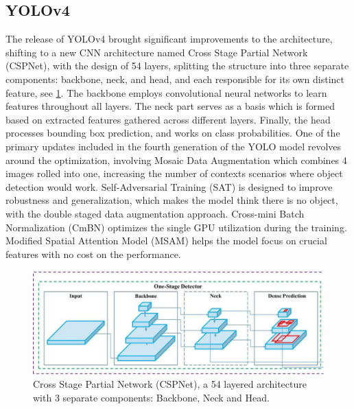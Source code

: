 \begin{multicols}{2}
\subsection{YOLOv4}
The release of YOLOv4 brought significant improvements to the architecture, shifting to a new CNN architecture named Cross Stage Partial Network (CSPNet), with the design of 54 layers, splitting the structure into three separate components: backbone, neck, and head, and each responsible for its own distinct feature, see \ref{fig:CSPNet}. The backbone employs convolutional neural networks to learn features throughout all layers. The neck part serves as a basis which is formed based on extracted features gathered across different layers. Finally, the head processes bounding box prediction, and works on class probabilities. One of the primary updates included in the fourth generation of the YOLO model revolves around the optimization, involving Mosaic Data Augmentation which combines 4 images rolled into one, increasing the number of contexts scenarios where object detection would work. Self-Adversarial Training (SAT) is designed to improve robustness and generalization, which makes the model think there is no object, with the double staged data augmentation approach. Cross-mini Batch Normalization (CmBN) optimizes the single GPU utilization during the training. Modified Spatial Attention Model (MSAM) helps the model focus on crucial features with no cost on the performance. 
\end{multicols}

\begin{figure}[ht]
    \centering
    \includegraphics[width=1\linewidth]{Cross Stage Partial Network (CSPNet).png}
    \caption{Cross Stage Partial Network (CSPNet), a 54 layered architecture with 3 separate components: Backbone, Neck and Head.}
    \label{fig:CSPNet}
\end{figure}
 
